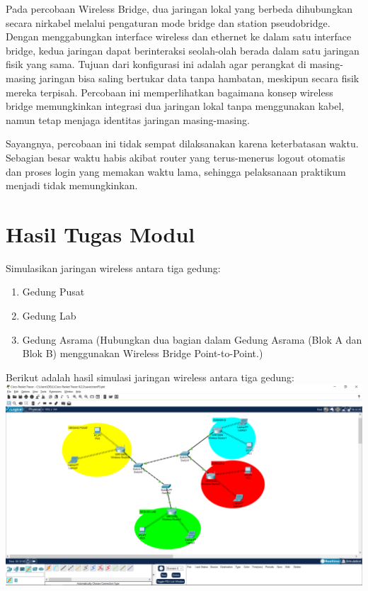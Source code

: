 \begin{enumerate}
    Pada percobaan Wireless Bridge, dua jaringan lokal yang berbeda dihubungkan secara nirkabel melalui pengaturan mode bridge dan station pseudobridge. Dengan menggabungkan interface wireless dan ethernet ke dalam satu interface bridge, kedua jaringan dapat berinteraksi seolah-olah berada dalam satu jaringan fisik yang sama. Tujuan dari konfigurasi ini adalah agar perangkat di masing-masing jaringan bisa saling bertukar data tanpa hambatan, meskipun secara fisik mereka terpisah. Percobaan ini memperlihatkan bagaimana konsep wireless bridge memungkinkan integrasi dua jaringan lokal tanpa menggunakan kabel, namun tetap menjaga identitas jaringan masing-masing.

    Sayangnya, percobaan ini tidak sempat dilaksanakan karena keterbatasan waktu. Sebagian besar waktu habis akibat router yang terus-menerus logout otomatis dan proses login yang memakan waktu lama, sehingga pelaksanaan praktikum menjadi tidak memungkinkan.
\end{enumerate}
\section{Hasil Tugas Modul}
Simulasikan jaringan wireless antara tiga gedung:
\begin{enumerate}
    \item Gedung Pusat
    \item Gedung Lab
    \item Gedung Asrama (Hubungkan dua bagian dalam Gedung Asrama (Blok A dan Blok B) menggunakan Wireless Bridge Point-to-Point.)
\end{enumerate}

Berikut adalah hasil simulasi jaringan wireless antara tiga gedung:
\newline \includegraphics[scale=0.2]{P1/img/2.png}
